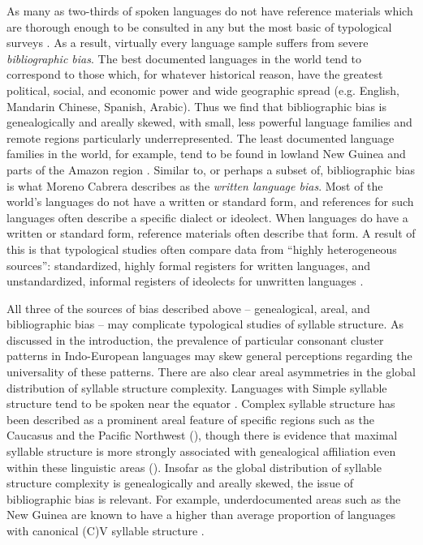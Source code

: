   As many as two-thirds of spoken languages do not have reference materials which are thorough enough to be consulted in any but the most basic of typological surveys \citep[106]{Bakker2011}. As a result, virtually every language sample suffers from severe \textit{bibliographic bias}. The best documented languages in the world tend to correspond to those which, for whatever historical reason, have the greatest political, social, and economic power and wide geographic spread (e.g. English, Mandarin Chinese, Spanish, Arabic). Thus we find that bibliographic bias is genealogically and areally skewed, with small, less powerful language families and remote regions particularly underrepresented. The least documented language families in the world, for example, tend to be found in lowland New Guinea and parts of the Amazon region \citep{Hammarström2010}. Similar to, or perhaps a subset of, bibliographic bias is what Moreno Cabrera describes as the \textit{written language bias}. Most of the world’s languages do not have a written or standard form, and references for such languages often describe a specific dialect or ideolect. When languages do have a written or standard form, reference materials often describe that form. A result of this is that typological studies often compare data from “highly heterogeneous sources”: standardized, highly formal registers for written languages, and unstandardized, informal registers of ideolects for unwritten languages \citep[118]{MorenoCabrera2008}.

  All three of the sources of bias described above -- genealogical, areal, and bibliographic bias -- may complicate typological studies of syllable structure. As discussed in the introduction, the prevalence of particular consonant cluster patterns in Indo-European languages may skew general perceptions regarding the universality of these patterns. There are also clear areal asymmetries in the global distribution of syllable structure complexity. Languages with Simple syllable structure tend to be spoken near the equator \citep{Maddieson2013a}. Complex syllable structure has been described as a prominent areal feature of specific regions such as the Caucasus \citep{Chirikba2008} and the Pacific Northwest (\citealt{ThompsonKinkade1990}), though there is evidence that maximal syllable structure is more strongly associated with genealogical affiliation even within these linguistic areas (\citealt{NapoleãodeSouza2017}). Insofar as the global distribution of syllable structure complexity is genealogically and areally skewed, the issue of bibliographic bias is relevant. For example, underdocumented areas such as the New Guinea are known to have a higher than average proportion of languages with canonical (C)V syllable structure \citep{Maddieson2013a}.

